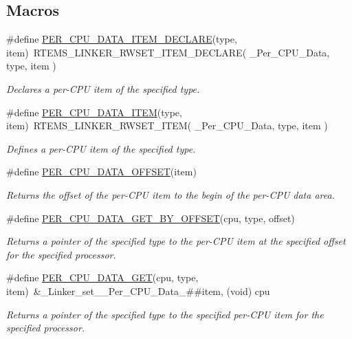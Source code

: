 \subsection*{Macros}
\begin{DoxyCompactItemize}
\item 
\#define \mbox{\hyperlink{group__PerCPUData_gaeceb44ec5ecddd9d2a7e93b2cb4c5333}{P\+E\+R\+\_\+\+C\+P\+U\+\_\+\+D\+A\+T\+A\+\_\+\+I\+T\+E\+M\+\_\+\+D\+E\+C\+L\+A\+RE}}(type,  item)~R\+T\+E\+M\+S\+\_\+\+L\+I\+N\+K\+E\+R\+\_\+\+R\+W\+S\+E\+T\+\_\+\+I\+T\+E\+M\+\_\+\+D\+E\+C\+L\+A\+RE( \+\_\+\+Per\+\_\+\+C\+P\+U\+\_\+\+Data, type, item )
\begin{DoxyCompactList}\small\item\em Declares a per-\/\+C\+PU item of the specified type. \end{DoxyCompactList}\item 
\#define \mbox{\hyperlink{group__PerCPUData_gac1e5813075233fec81e9f4bd4a5a5084}{P\+E\+R\+\_\+\+C\+P\+U\+\_\+\+D\+A\+T\+A\+\_\+\+I\+T\+EM}}(type,  item)~R\+T\+E\+M\+S\+\_\+\+L\+I\+N\+K\+E\+R\+\_\+\+R\+W\+S\+E\+T\+\_\+\+I\+T\+EM( \+\_\+\+Per\+\_\+\+C\+P\+U\+\_\+\+Data, type, item )
\begin{DoxyCompactList}\small\item\em Defines a per-\/\+C\+PU item of the specified type. \end{DoxyCompactList}\item 
\#define \mbox{\hyperlink{group__PerCPUData_gaea23d946a72e70c72bad510257f9aae3}{P\+E\+R\+\_\+\+C\+P\+U\+\_\+\+D\+A\+T\+A\+\_\+\+O\+F\+F\+S\+ET}}(item)
\begin{DoxyCompactList}\small\item\em Returns the offset of the per-\/\+C\+PU item to the begin of the per-\/\+C\+PU data area. \end{DoxyCompactList}\item 
\#define \mbox{\hyperlink{group__PerCPUData_ga440fcf85fc73f7e65b357f0fdeae27f3}{P\+E\+R\+\_\+\+C\+P\+U\+\_\+\+D\+A\+T\+A\+\_\+\+G\+E\+T\+\_\+\+B\+Y\+\_\+\+O\+F\+F\+S\+ET}}(cpu,  type,  offset)
\begin{DoxyCompactList}\small\item\em Returns a pointer of the specified type to the per-\/\+C\+PU item at the specified offset for the specified processor. \end{DoxyCompactList}\item 
\#define \mbox{\hyperlink{group__PerCPUData_gade0bfa7d761c3fecd76535570234a98e}{P\+E\+R\+\_\+\+C\+P\+U\+\_\+\+D\+A\+T\+A\+\_\+\+G\+ET}}(cpu,  type,  item)~\&\+\_\+\+Linker\+\_\+set\+\_\+\+\_\+\+Per\+\_\+\+C\+P\+U\+\_\+\+Data\+\_\+\#\#item, (void) cpu
\begin{DoxyCompactList}\small\item\em Returns a pointer of the specified type to the specified per-\/\+C\+PU item for the specified processor. \end{DoxyCompactList}\end{DoxyCompactItemize}
